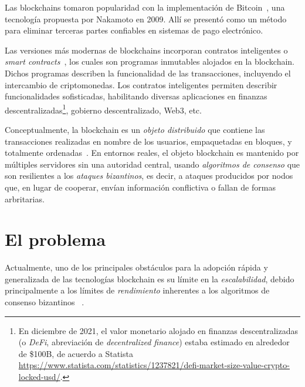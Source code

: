 Las blockchains tomaron
popularidad con la implementación de Bitcoin~\cite{nakamoto06bitcoin},
una tecnología propuesta por Nakamoto en 2009.
Allí se presentó como un método para eliminar terceras partes confiables en sistemas
de pago electrónico.
%

Las versiones más modernas de blockchains incorporan contratos inteligentes o
\textit{smart contracts}~\cite{szabo96smart,wood2014ethereum},
los cuales son programas inmutables alojados en la blockchain. Dichos
programas describen la funcionalidad de las transacciones, incluyendo el intercambio
de criptomonedas.
%
Los contratos inteligentes permiten describir funcionalidades sofisticadas, habilitando
diversas aplicaciones en finanzas descentralizadas\footnote{En diciembre de 2021,
el valor monetario alojado en finanzas descentralizadas (o \emph{DeFi}, abreviación de \emph{decentralized finance})
estaba estimado en alrededor de \$100B, de acuerdo a Statista
\url{https://www.statista.com/statistics/1237821/defi-market-size-value-crypto-locked-usd/}.},
gobierno descentralizado, Web3, etc.
%

Conceptualmente, la blockchain es un \textit{objeto distribuido}
que contiene las transacciones realizadas
en nombre de los usuarios, empaquetadas en bloques, y totalmente
ordenadas~\cite{anta2018formalizing,anta2021principles}.
%
En entornos reales, el objeto blockchain es mantenido por múltiples servidores
sin una autoridad central, usando \emph{algoritmos de consenso} que son resilientes a los
\emph{ataques bizantinos},
es decir, a ataques producidos por nodos que, en lugar de cooperar,
envían información conflictiva o fallan de formas arbritarias.
%



\section{El problema}

Actualmente, uno de los principales obstáculos para la adopción rápida y generalizada
de las tecnologías blockchain es su límite en la \emph{escalabilidad}, debido principalmente a los límites
de \emph{rendimiento} inherentes a los algoritmos de consenso bizantinos
~\cite{Tyagi@BlockchainScalabilitySol,Croman2016ScalingDecentralizedBlockchain}.


